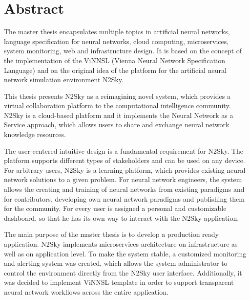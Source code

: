 
%

\thispagestyle{empty}

\section*{Abstract}

The master thesis encapsulates multiple topics in artificial neural networks, language specification for neural networks, cloud computing, microservices, system monitoring, web and infrastructure design. It is based on the concept of the implementation of the ViNNSL (Vienna Neural Network Specification Language) and on the original idea of the platform for the artificial neural network simulation environment N2Sky. 

This thesis presents N2Sky as a reimagining novel system, which provides a virtual collaboration platform to the computational intelligence community. N2Sky is a cloud-based platform and it implements the Neural Network as a Service approach, which allows users to share and exchange neural network knowledge resources.

The user-centered intuitive design is a fundamental requirement for N2Sky. The platform supports different types of stakeholders and can be used on any device. For arbitrary users, N2Sky is a learning platform, which provides existing neural network solutions to a given problem. For neural network engineers, the system allows the creating and training of neural networks from existing paradigms and for contributors, developing own neural network paradigms and publishing them for the community. For every user is assigned a personal and customizable dashboard, so that he has its own way to interact with the N2Sky application. 

The main purpose of the master thesis is to develop a production ready application. N2Sky implements microservices architecture on infrastructure as well as on application level. To make the system stable, a customized monitoring and alerting system was created, which allows the system administrator to control the environment directly from the N2Sky user interface. Additionally, it was decided to implement ViNNSL template in order to support transparent neural network workflows across the entire application.


